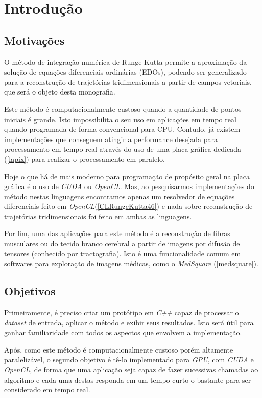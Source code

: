 \chapter{Introdução}

\section{Motivações}
O método de integração numérica de Runge-Kutta permite a aproximação da solução de equações diferenciais ordinárias (EDOs), podendo ser generalizado para a reconstrução de trajetórias tridimensionais a partir de campos vetoriais, que será o objeto desta monografia.

Este método é computacionalmente custoso quando a quantidade de pontos iniciais é grande. Isto impossibilita o seu uso em aplicações em tempo real quando programada de forma convencional para CPU. Contudo, já existem implementações que conseguem atingir a performance desejada para processamento em tempo real através do uso de uma placa gráfica dedicada (\ref{lapix}) para realizar o processamento em paralelo.

Hoje o que há de mais moderno para programação de propósito geral na placa gráfica é o uso de \textit{CUDA} ou \textit{OpenCL}. Mas, ao pesquisarmos implementações do método nestas linguagens encontramos apenas um resolvedor de equações diferenciais feito em \textit{OpenCL}(\ref{CLRungeKutta46}) e nada sobre reconstrução de trajetórias tridimensionais foi feito em ambas as linguagens.

Por fim, uma das aplicações para este método é a reconstrução de fibras musculares ou do tecido branco cerebral a partir de imagens por difusão de tensores (conhecido por tractografia). Isto é uma funcionalidade comum em softwares para exploração de imagens médicas, como o \textit{MedSquare} (\ref{medsquare}).

\section{Objetivos}
Primeiramente, é preciso criar um protótipo em \textit{C++} capaz de processar o \textit{dataset} de entrada, aplicar o método e exibir seus resultados. Isto será útil para ganhar familiaridade com todos os aspectos que envolvem a implementação.

\newpage
Após, como este método é computacionalmente custoso porém altamente paralelizável, o segundo objetivo é tê-lo implementado para \textit{GPU}, com \textit{CUDA} e \textit{OpenCL}, de forma que uma aplicação seja capaz de fazer sucessivas chamadas ao algoritmo e cada uma destas responda em um tempo curto o bastante para ser considerado em tempo real.


